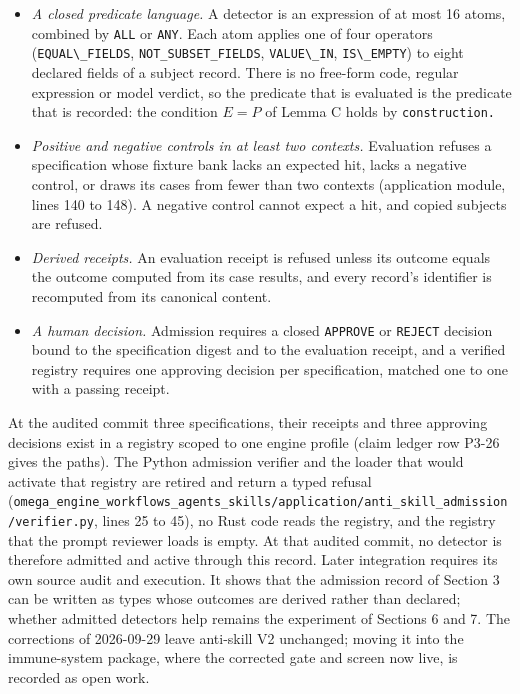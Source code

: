 \documentclass[
  11pt,
]{article}
\newcommand{\passthrough}[1]{#1}
\providecommand{\tightlist}{%
  \setlength{\itemsep}{0pt}\setlength{\parskip}{0pt}}
\begin{document}
\begin{itemize}
\tightlist
\item
  \emph{A closed predicate language.} A detector is an expression of at
  most 16 atoms, combined by \passthrough{\lstinline!ALL!} or
  \passthrough{\lstinline!ANY!}. Each atom applies one of four operators
  (\passthrough{\lstinline!EQUAL\_FIELDS!},
  \nolinkurl{NOT_SUBSET_FIELDS}, \passthrough{\lstinline!VALUE\_IN!},
  \passthrough{\lstinline!IS\_EMPTY!}) to eight declared fields of a
  subject record. There is no free-form code, regular expression or
  model verdict, so the predicate that is evaluated is the predicate
  that is recorded: the condition \(E = P\) of Lemma C holds by
  \nolinkurl{construction.}
\item
  \emph{Positive and negative controls in at least two contexts.}
  Evaluation refuses a specification whose fixture bank lacks an
  expected hit, lacks a negative control, or draws its cases from fewer
  than two contexts (application module, lines 140 to 148). A negative
  control cannot expect a hit, and copied subjects are refused.
\item
  \emph{Derived receipts.} An evaluation receipt is refused unless its
  outcome equals the outcome computed from its case results, and every
  record's identifier is recomputed from its canonical content.
\item
  \emph{A human decision.} Admission requires a closed
  \passthrough{\lstinline!APPROVE!} or \passthrough{\lstinline!REJECT!}
  decision bound to the specification digest and to the evaluation
  receipt, and a verified registry requires one approving decision per
  specification, matched one to one with a passing receipt.
\end{itemize}

At the audited commit three specifications, their receipts and three
approving decisions exist in a registry scoped to one engine profile
(claim ledger row P3-26 gives the paths). The Python admission verifier
and the loader that would activate that registry are retired and return
a typed refusal
(\nolinkurl{omega_engine_workflows_agents_skills/application/anti_skill_admission/verifier.py},
lines 25 to 45), no Rust code reads the registry, and the registry that
the prompt reviewer loads is empty. At that audited commit, no detector
is therefore admitted and active through this record. Later integration
requires its own source audit and execution. It shows that the admission
record of Section 3 can be written as types whose outcomes are derived
rather than declared; whether admitted detectors help remains the
experiment of Sections 6 and 7. The corrections of 2026-09-29 leave
anti-skill V2 unchanged; moving it into the immune-system package, where
the corrected gate and screen now live, is recorded as open work.
\end{document}
